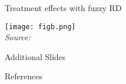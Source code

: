 \documentclass[aspectratio=169,compress,handout,t,xcolor=table]{beamer}
\begin{document}
\begin{frame}{Treatment effects with fuzzy RD}
  \begin{center}
    \texttt{[image: figb.png]} \\
    {\tiny \emph{Source:} \citet*{Angrist1999}}
  \end{center}
\end{frame}

\appendix
\begin{frame}[plain,c]
  \centerline{\Large{{ Additional Slides}}}
\end{frame}
\addtocounter{framenumber}{-1}
\begin{frame}[allowframebreaks]{References}
  
  \linespread{1}
  \begin{footnotesize}
  
  \end{footnotesize}
\end{frame}
\end{document}
